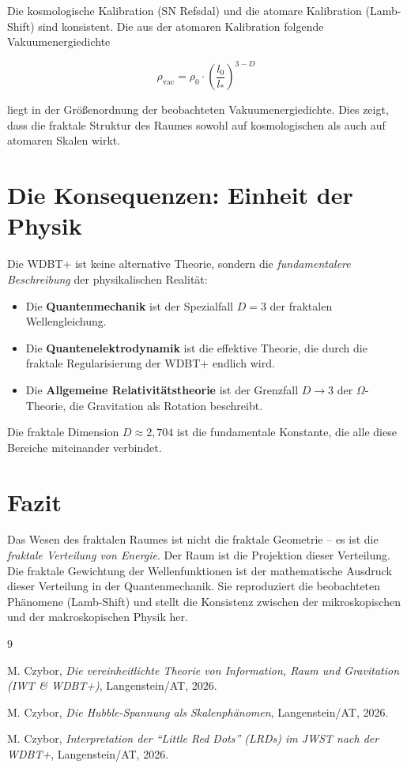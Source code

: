\documentclass[12pt,a4paper]{article}
\begin{document}
Die kosmologische Kalibration (SN Refsdal) und die atomare Kalibration (Lamb-Shift) sind konsistent. Die aus der atomaren Kalibration folgende Vakuumenergiedichte

\begin{equation}
\rho_{\text{vac}} = \rho_0 \cdot \left( \frac{l_0}{l_*} \right)^{3-D}
\end{equation}

liegt in der Größenordnung der beobachteten Vakuumenergiedichte. Dies zeigt, dass die fraktale Struktur des Raumes sowohl auf kosmologischen als auch auf atomaren Skalen wirkt.

\section{Die Konsequenzen: Einheit der Physik}

Die WDBT+ ist keine alternative Theorie, sondern die \emph{fundamentalere Beschreibung} der physikalischen Realität:

\begin{itemize}
    \item Die \textbf{Quantenmechanik} ist der Spezialfall \(D = 3\) der fraktalen Wellengleichung.
    \item Die \textbf{Quantenelektrodynamik} ist die effektive Theorie, die durch die fraktale Regularisierung der WDBT+ endlich wird.
    \item Die \textbf{Allgemeine Relativitätstheorie} ist der Grenzfall \(D \to 3\) der \(\Omega\)-Theorie, die Gravitation als Rotation beschreibt.
\end{itemize}

Die fraktale Dimension \(D \approx 2,704\) ist die fundamentale Konstante, die alle diese Bereiche miteinander verbindet.

\section{Fazit}

Das Wesen des fraktalen Raumes ist nicht die fraktale Geometrie – es ist die \emph{fraktale Verteilung von Energie}. Der Raum ist die Projektion dieser Verteilung. Die fraktale Gewichtung der Wellenfunktionen ist der mathematische Ausdruck dieser Verteilung in der Quantenmechanik. Sie reproduziert die beobachteten Phänomene (Lamb-Shift) und stellt die Konsistenz zwischen der mikroskopischen und der makroskopischen Physik her.


\begin{thebibliography}{9}

M. Czybor, \emph{Die vereinheitlichte Theorie von Information, Raum und Gravitation (IWT \& WDBT+)}, Langenstein/AT, 2026.

M. Czybor, \emph{Die Hubble-Spannung als Skalenphänomen}, Langenstein/AT, 2026.

M. Czybor, \emph{Interpretation der ``Little Red Dots'' (LRDs) im JWST nach der WDBT+}, Langenstein/AT, 2026.

\end{thebibliography}
\end{document}
